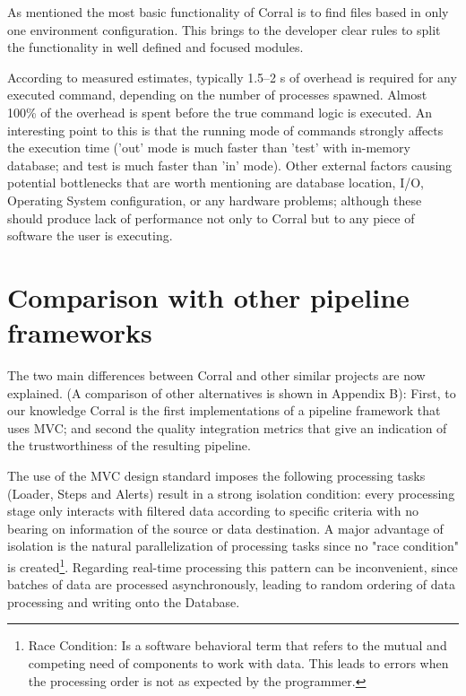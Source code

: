 \documentclass[final,5p,times,twocolumn,authoryear]{elsarticle}
\begin{document}
As mentioned the most basic functionality of Corral is to find files based in
only one environment configuration. This brings to the developer clear rules to split the functionality in well defined and focused modules.

According to measured estimates, typically 1.5--2 s of overhead is required for any
executed command, depending on the number of processes spawned. Almost 100\% of the overhead is spent before the true command logic is executed.
%
An interesting point to this is that the running mode of commands strongly affects
the execution time ('out' mode is much faster than 'test' with
in-memory database; and test is much faster than 'in' mode).
%
\textcolor{blue!95}{
Other external factors causing potential bottlenecks that are worth mentioning
are database location, I/O, Operating System configuration, or any hardware problems;
although these should produce lack of performance not only to Corral but to
any piece of software the user is executing.}
%
%
\section{Comparison with other pipeline frameworks}
\label{section:comparison}
%
The two main differences between Corral and other similar projects are now explained.
(A comparison of other alternatives is shown in Appendix B):
First, to our knowledge Corral is the first implementations of a pipeline framework that uses MVC; and second the quality integration metrics that give an indication of the trustworthiness of the resulting pipeline.

The use of the MVC design standard imposes the following processing tasks (Loader, Steps and Alerts) result in a strong isolation condition:
%
every processing stage only interacts with filtered data according to specific criteria  with no bearing on information of the source or data destination.
%
A major advantage of isolation is the natural parallelization of processing tasks since
no "race condition" is created\footnote{Race Condition: Is a software behavioral term that refers to the mutual and competing need of components to work with data.
This leads to errors when the processing order is not as expected by the programmer.}.
%
%
Regarding real-time processing this pattern can be inconvenient, since
batches of data are processed asynchronously, leading to random ordering
of data processing and writing onto the Database.
%
\end{document}
